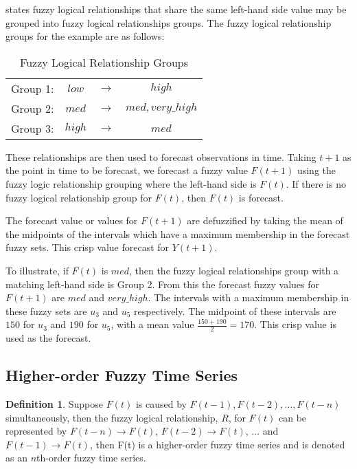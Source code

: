 \documentclass[12pt]{article}
\theoremstyle{definition}
\newtheorem{ftsdef}{Definition}
\begin{document}
 states fuzzy logical relationships that share the same left-hand side value may be grouped into fuzzy logical relationships groups. The fuzzy logical relationship groups for the example are as follows:

\begin{table}[h]
	\center
	\begin{tabular}{ c c c c }
  	Group 1: & $low$ & $\rightarrow$ & $high$ \\
  	Group 2: & $med$ & $\rightarrow$ & $med, very\_high$ \\
  	Group 3: & $high$ & $\rightarrow$ & $med$ \\
	\end{tabular}
	\caption{Fuzzy Logical Relationship Groups}
\end{table}

These relationships are then used to forecast observations in time. Taking $t+1$ as the point in time to be forecast, we forecast a fuzzy value $F(t+1)$ using the fuzzy logic relationship grouping where the left-hand side is $F(t)$. If there is no fuzzy logical relationship group for $F(t)$, then $F(t)$ is forecast.

The forecast value or values for $F(t+1)$ are defuzzified by taking the mean of the midpoints of the intervals which have a maximum membership in the forecast fuzzy sets. This crisp value forecast for $Y(t+1)$.

To illustrate, if $F(t)$ is $med$, then the fuzzy logical relationships group with a matching left-hand side is Group 2. From this the forecast fuzzy values for $F(t+1)$ are $med$ and $very\_high$. The intervals with a maximum membership in these fuzzy sets are $u_3$ and $u_5$ respectively. The midpoint of these intervals are $150$ for $u_3$ and $190$ for $u_5$, with a mean value $\frac{150 + 190}{2}=170$. This crisp value is used as the forecast.

\subsection{Higher-order Fuzzy Time Series}
\label{higher-order}
\begin{ftsdef}
\label{def5}
Suppose $F(t)$ is caused by $F(t-1),F(t-2),\ldots,F(t-n)$ simultaneously, then the fuzzy logical relationship, $R$, for $F(t)$ can be represented by $F(t-n)\rightarrow F(t)$, $F(t-2) \rightarrow F(t)$, $\ldots$ and $F(t-1) \rightarrow F(t)$, then F(t) is a higher-order fuzzy time series and is denoted as an $n$th-order fuzzy time series.
\end{ftsdef}
\end{document}
